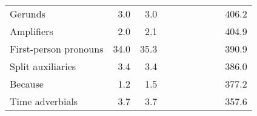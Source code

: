 \begin{table}[!t]
\begin{tabular*}{\linewidth}{@{\extracolsep{\fill}}lrrrrrrrrr}
Gerunds & 3.0 & 3.0 & {\cellcolor[HTML]{92C5DE}{\textcolor[HTML]{000000}{156\%}}} & {\cellcolor[HTML]{92C5DE}{\textcolor[HTML]{000000}{152\%}}} & {\cellcolor[HTML]{D1E5F0}{\textcolor[HTML]{000000}{119\%}}} & {\cellcolor[HTML]{D1E5F0}{\textcolor[HTML]{000000}{124\%}}} & {\cellcolor[HTML]{FDDBC7}{\textcolor[HTML]{000000}{83\%}}} & {\cellcolor[HTML]{FDDBC7}{\textcolor[HTML]{000000}{86\%}}} & 406.2 \\ 
Amplifiers & 2.0 & 2.1 & {\cellcolor[HTML]{F4A582}{\textcolor[HTML]{000000}{63\%}}} & {\cellcolor[HTML]{D6604D}{\textcolor[HTML]{FFFFFF}{46\%}}} & {\cellcolor[HTML]{D6604D}{\textcolor[HTML]{FFFFFF}{40\%}}} & {\cellcolor[HTML]{D6604D}{\textcolor[HTML]{FFFFFF}{45\%}}} & {\cellcolor[HTML]{FDDBC7}{\textcolor[HTML]{000000}{85\%}}} & {\cellcolor[HTML]{FDDBC7}{\textcolor[HTML]{000000}{85\%}}} & 404.9 \\ 
First-person pronouns & 34.0 & 35.3 & {\cellcolor[HTML]{FDDBC7}{\textcolor[HTML]{000000}{81\%}}} & {\cellcolor[HTML]{F4A582}{\textcolor[HTML]{000000}{62\%}}} & {\cellcolor[HTML]{D1E5F0}{\textcolor[HTML]{000000}{111\%}}} & {\cellcolor[HTML]{F7F7F7}{\textcolor[HTML]{000000}{108\%}}} & {\cellcolor[HTML]{92C5DE}{\textcolor[HTML]{000000}{136\%}}} & {\cellcolor[HTML]{D1E5F0}{\textcolor[HTML]{000000}{127\%}}} & 390.9 \\ 
Split auxiliaries & 3.4 & 3.4 & {\cellcolor[HTML]{F7F7F7}{\textcolor[HTML]{000000}{91\%}}} & {\cellcolor[HTML]{FDDBC7}{\textcolor[HTML]{000000}{77\%}}} & {\cellcolor[HTML]{D1E5F0}{\textcolor[HTML]{000000}{126\%}}} & {\cellcolor[HTML]{D1E5F0}{\textcolor[HTML]{000000}{118\%}}} & {\cellcolor[HTML]{F7F7F7}{\textcolor[HTML]{000000}{98\%}}} & {\cellcolor[HTML]{F7F7F7}{\textcolor[HTML]{000000}{92\%}}} & 386.0 \\ 
Because & 1.2 & 1.5 & {\cellcolor[HTML]{B2182B}{\textcolor[HTML]{FFFFFF}{19\%}}} & {\cellcolor[HTML]{B2182B}{\textcolor[HTML]{FFFFFF}{20\%}}} & {\cellcolor[HTML]{D6604D}{\textcolor[HTML]{FFFFFF}{38\%}}} & {\cellcolor[HTML]{D6604D}{\textcolor[HTML]{FFFFFF}{38\%}}} & {\cellcolor[HTML]{D1E5F0}{\textcolor[HTML]{000000}{121\%}}} & {\cellcolor[HTML]{F7F7F7}{\textcolor[HTML]{000000}{105\%}}} & 377.2 \\ 
Time adverbials & 3.7 & 3.7 & {\cellcolor[HTML]{FDDBC7}{\textcolor[HTML]{000000}{77\%}}} & {\cellcolor[HTML]{FDDBC7}{\textcolor[HTML]{000000}{79\%}}} & {\cellcolor[HTML]{F4A582}{\textcolor[HTML]{000000}{68\%}}} & {\cellcolor[HTML]{F4A582}{\textcolor[HTML]{000000}{70\%}}} & {\cellcolor[HTML]{D1E5F0}{\textcolor[HTML]{000000}{115\%}}} & {\cellcolor[HTML]{D1E5F0}{\textcolor[HTML]{000000}{119\%}}} & 357.6 \\ 

\end{tabular*}
\end{table}
